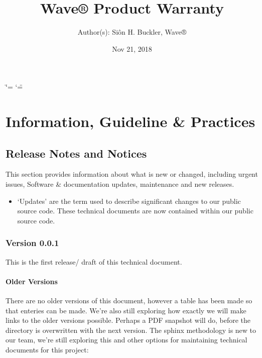 \documentclass[letterpaper,10pt,english]{sphinxmanual}
\title{Wave® Product Warranty}
\date{Nov 21, 2018}
\author{Author(s): Siôn H. Buckler, Wave®}
\begin{document}
\ifdefined\shorthandoff
  \ifnum\catcode`\=\string=\active\shorthandoff{=}\fi
  \ifnum\catcode`\"=\active{}\fi
\fi

\pagestyle{empty}
\maketitle
\pagestyle{plain}
\sphinxtableofcontents
\pagestyle{normal}
\label{\detokenize{index::doc}}



\chapter{Information, Guideline \& Practices}
\label{\detokenize{index:information-guideline-practices}}

\section{Release Notes and Notices}
\label{\detokenize{releasenotes:release-notes-and-notices}}\label{\detokenize{releasenotes::doc}}
This section provides information about what is new or changed, including urgent issues, Software \& documentation updates, maintenance and new releases.
\begin{itemize}
\item {} 
‘Updates’ are the term used to describe significant changes to our public source code. These technical documents are now contained within our public source code.

\end{itemize}


\subsection{Version 0.0.1}
\label{\detokenize{releasenotes:version-0-0-1}}
This is the first release/ draft of this technical document.


\subsubsection{Older Versions}
\label{\detokenize{releasenotes:older-versions}}
There are no older versions of this document, however a table has been made so that enteries can be made. We’re also still exploring how exactly we will make links to the older versions possible. Perhaps a PDF snapshot will do, before the directory is overwritten with the next version. The sphinx methodology is new to our team, we’re still exploring this and other options for maintaining technical documents for this project:
\end{document}
